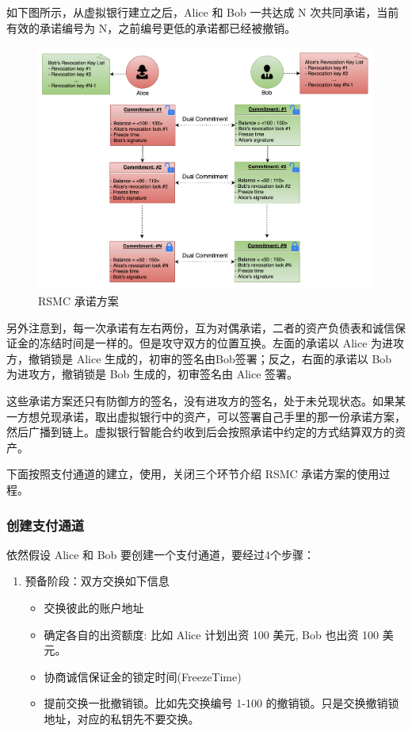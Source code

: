 \begin{appendices}
如下图所示，从虚拟银行建立之后，Alice 和 Bob 一共达成 N 次共同承诺，当前有效的承诺编号为 N，之前编号更低的承诺都已经被撤销。

\begin{figure}[h!]
    \centering
    \includegraphics[width=12cm, keepaspectratio]{../images/dual_rsmc_3.png}
    \caption{RSMC 承诺方案}
    \label{fig:rsmc_3}
\end{figure}

另外注意到，每一次承诺有左右两份，互为对偶承诺，二者的资产负债表和诚信保证金的冻结时间是一样的。但是攻守双方的位置互换。左面的承诺以 Alice 为进攻方，撤销锁是 Alice 生成的，初审的签名由Bob签署；反之，右面的承诺以 Bob 为进攻方，撤销锁是 Bob 生成的，初审签名由 Alice 签署。

这些承诺方案还只有防御方的签名，没有进攻方的签名，处于未兑现状态。如果某一方想兑现承诺，取出虚拟银行中的资产，可以签署自己手里的那一份承诺方案，然后广播到链上。虚拟银行智能合约收到后会按照承诺中约定的方式结算双方的资产。

下面按照支付通道的建立，使用，关闭三个环节介绍 RSMC 承诺方案的使用过程。

\subsubsection{创建支付通道}
依然假设 Alice 和 Bob 要创建一个支付通道，要经过4个步骤：
\begin{enumerate}
    \item 预备阶段：双方交换如下信息
        \begin{itemize}
            \item 交换彼此的账户地址 
            \item 确定各自的出资额度: 比如 Alice 计划出资 100 美元, Bob 也出资 100 美元。
            \item 协商诚信保证金的锁定时间(FreezeTime)
            \item 提前交换一批撤销锁。比如先交换编号 1-100 的撤销锁。只是交换撤销锁地址，对应的私钥先不要交换。
        \end{itemize}
    

\end{enumerate}
\end{appendices}
